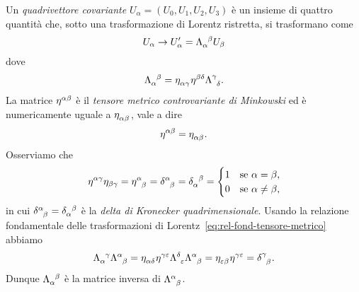 Un \emph{quadrivettore covariante}
$U_{\alpha} = (U_{0}, U_{1}, U_{2}, U_{3})$ è un insieme di quattro quantità
che, sotto una trasformazione di Lorentz ristretta, si trasformano come
\begin{equation}
  U_{\alpha} \to U'_{\alpha} = \tensor{\Lambda}{_{\alpha}^{\beta}}U_{\beta}
\end{equation}
dove
\begin{equation}
  \tensor{\Lambda}{_{\alpha}^{\beta}} = \tensor{\eta}{_{\alpha\gamma}}
  \tensor{\eta}{^{\beta\delta}} \tensor{\Lambda}{^{\gamma}_{\delta}}.
\end{equation}
La matrice $\tensor{\eta}{^{\alpha\beta}}$ è il
\emph{tensore metrico controvariante di
  Minkowski}
ed è numericamente uguale a $\tensor{\eta}{_{\alpha\beta}}$, vale a dire
\begin{equation}
  \tensor{\eta}{^{\alpha\beta}} = \tensor{\eta}{_{\alpha\beta}}.
\end{equation}
Osserviamo che
\begin{equation}
  \label{eq:delta-kronecker}
  \eta^{\alpha\gamma} \eta_{\beta\gamma} = \tensor{\eta}{^{\alpha}_{\beta}} =
  \tensor{\delta}{^{\alpha}_{\beta}} = \tensor{\delta}{_{\alpha}^{\beta}} =
  \begin{cases}
    1 & \text{se } \alpha = \beta, \\
    0 & \text{se } \alpha \neq \beta,
  \end{cases}
\end{equation}
in cui $\tensor{\delta}{^{\alpha}_{\beta}} = \tensor{\delta}{_{\alpha}^{\beta}}$
è la \emph{delta di Kronecker
  quadrimensionale}. Usando la relazione fondamentale delle trasformazioni di
Lorentz~\eqref{eq:rel-fond-tensore-metrico} abbiamo
\begin{equation}
  \tensor{\Lambda}{_{\alpha}^{\gamma}} \tensor{\Lambda}{^{\alpha}_{\beta}} =
  \tensor{\eta}{_{\alpha\delta}} \tensor{\eta}{^{\gamma\epsilon}}
  \tensor{\Lambda}{^{\delta}_{\epsilon}} \tensor{\Lambda}{^{\alpha}_{\beta}} =
  \tensor{\eta}{_{\epsilon\beta}} \tensor{\eta}{^{\gamma\epsilon}} =
  \tensor{\delta}{^{\gamma}_{\beta}}.
\end{equation}
Dunque $\tensor{\Lambda}{_{\alpha}^{\beta}}$ è la matrice inversa di
$\tensor{\Lambda}{^{\alpha}_{\beta}}$.

